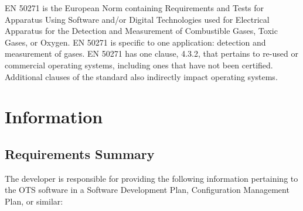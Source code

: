 \documentclass[12pt]{../Common_files/ElisaPaper}
\begin{document}
\bigbreak
EN 50271 \cite{EN50271} is the European Norm containing Requirements and Tests for Apparatus Using Software and/or Digital Technologies used for Electrical Apparatus for the Detection and Measurement of Combustible Gases, Toxic Gases, or Oxygen.  EN 50271 is specific to one application: detection and measurement of gases.  EN 50271 has one clause, 4.3.2, that pertains to re-used or commercial operating systems, including ones that have not been certified.  Additional clauses of the standard also indirectly impact operating systems.

\section{Information}
\subsection{Requirements Summary}
The developer is responsible for providing the following information pertaining to the OTS software in a Software Development Plan, Configuration Management Plan, or similar:
\end{document}
